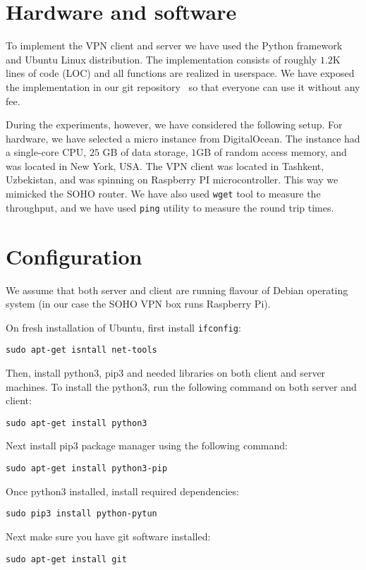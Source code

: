 \section{Hardware and software}
\label{sec:hardware}

To implement the VPN client and server we have used the Python 
framework and Ubuntu Linux distribution. The implementation consists 
of roughly $1.2$K lines of code (LOC) and all functions are realized 
in userspace. We have exposed the implementation in our git 
repository~\cite{impl} so that everyone can use it without any fee.

During the experiments, however, we have considered the following setup. 
For hardware, we have selected a micro instance from DigitalOcean. The 
instance had a single-core CPU, $25$ GB of data storage, $1$GB of random 
access memory, and was located in New York, USA. The VPN client was located 
in Tashkent, Uzbekistan, and was spinning on Raspberry PI microcontroller. 
This way we mimicked the SOHO router. We have also used \texttt{wget} tool to measure 
the throughput, and we have used \texttt{ping} utility to measure the round trip times. 

\section{Configuration}
\label{sec:configuration}

We assume that both server and client are 
running flavour of Debian operating system
(in our case the SOHO VPN box runs Raspberry Pi).

On fresh installation of Ubuntu, first install
\texttt{ifconfig}:

\texttt{sudo apt-get isntall net-tools}

Then, install python3, pip3 and 
needed libraries on both client and server 
machines. To install the python3, run the 
following command on both server and client:

\texttt{sudo apt-get install python3}

Next install pip3 package manager using 
the following command:

\texttt{sudo apt-get install python3-pip}

Once python3 installed, install 
required dependencies:

\texttt{sudo pip3 install python-pytun}

Next make sure you have git software 
installed:

\texttt{sudo apt-get install git}

